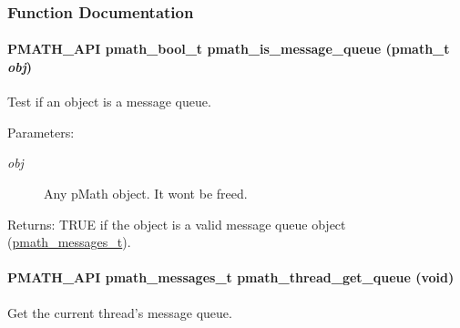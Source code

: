 \subsubsection{Function Documentation}
\hypertarget{group__threadmsg_g93b45ad8c3063c94602c8bbaaf3c2613}{
\paragraph[{pmath\_\-is\_\-message\_\-queue}]{\setlength{\rightskip}{0pt plus 5cm}PMATH\_\-API {\bf pmath\_\-bool\_\-t} pmath\_\-is\_\-message\_\-queue ({\bf pmath\_\-t} {\em obj})}\hfill}
\label{group__threadmsg_g93b45ad8c3063c94602c8bbaaf3c2613}


Test if an object is a message queue. 

\begin{Desc}
\item[Parameters:]
\begin{description}
\item[{\em obj}]Any pMath object. It wont be freed. \end{description}
\end{Desc}
\begin{Desc}
\item[Returns:]TRUE if the object is a valid message queue object (\hyperlink{classpmath__messages__t}{pmath\_\-messages\_\-t}). \end{Desc}
\hypertarget{group__threadmsg_gf4d69db0ffe06846e57df7cadcd3dab6}{
\paragraph[{pmath\_\-thread\_\-get\_\-queue}]{\setlength{\rightskip}{0pt plus 5cm}PMATH\_\-API {\bf pmath\_\-messages\_\-t} pmath\_\-thread\_\-get\_\-queue (void)}\hfill}
\label{group__threadmsg_gf4d69db0ffe06846e57df7cadcd3dab6}


Get the current thread's message queue. 

